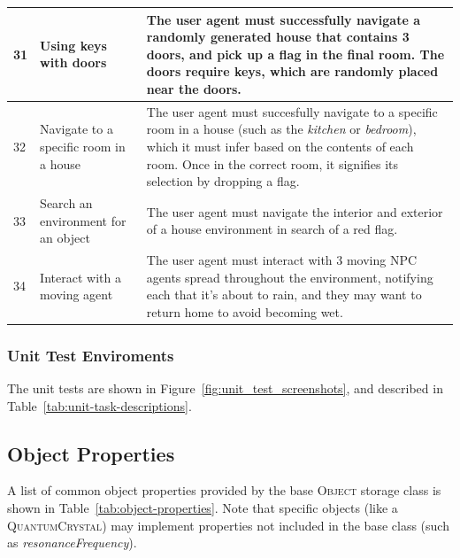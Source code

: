 \begin{table}[t!]
\begin{tabular}{p{0.3cm}p{3.7cm}p{8cm}}
\midrule
\rowcolor[HTML]{F3F3F3} 
31 & Using keys with doors & The user agent must successfully navigate a randomly generated house that contains 3 doors, and pick up a flag in the final room.  The doors require keys, which are randomly placed near the doors. \\
\midrule
32 & Navigate to a specific room in a house & The user agent must succesfully navigate to a specific room in a house (such as the \textit{kitchen} or \textit{bedroom}), which it must infer based on the contents of each room.  Once in the correct room, it signifies its selection by dropping a flag. \\
\midrule
\rowcolor[HTML]{F3F3F3} 
33 & Search an environment for an object & The user agent must navigate the interior and exterior of a house environment in search of a red flag. \\
\midrule
34 & Interact with a moving agent & The user agent must interact with 3 moving NPC agents spread throughout the environment, notifying each that it's about to rain, and they may want to return home to avoid becoming wet. \\
\bottomrule
\end{tabular}
\end{table}


\subsubsection{Unit Test Enviroments}
The unit tests are shown in Figure~\ref{fig:unit_test_screenshots}, and described in Table~\ref{tab:unit-task-descriptions}.




\subsection{Object Properties}
\label{sec:appendix-object-properties}

A list of common object properties provided by the base \textsc{Object} storage class is shown in Table~\ref{tab:object-properties}.  Note that specific objects (like a \textsc{QuantumCrystal}) may implement properties not included in the base class (such as \textit{resonanceFrequency}).

